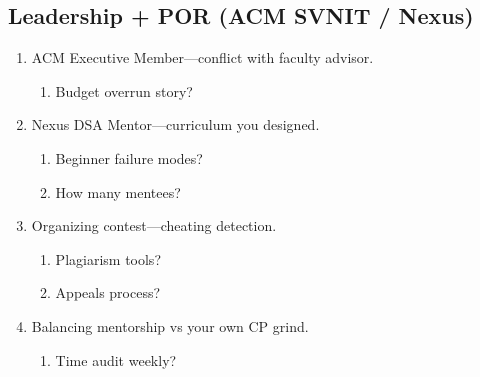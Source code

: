 \documentclass[9pt,a4paper]{article}
\begin{document}
\subsection{Leadership + POR (ACM SVNIT / Nexus)}
\begin{enumerate}[label=\textbf{Q\arabic*:}, leftmargin=*]
  \item ACM Executive Member---conflict with faculty advisor.
  \begin{enumerate}[label=\textit{FU\arabic*:}, leftmargin=2em]
    \item Budget overrun story?
  \end{enumerate}
  \item Nexus DSA Mentor---curriculum you designed.
  \begin{enumerate}[label=\textit{FU\arabic*:}, leftmargin=2em]
    \item Beginner failure modes?
    \item How many mentees?
  \end{enumerate}
  \item Organizing contest---cheating detection.
  \begin{enumerate}[label=\textit{FU\arabic*:}, leftmargin=2em]
    \item Plagiarism tools?
    \item Appeals process?
  \end{enumerate}
  \item Balancing mentorship vs your own CP grind.
  \begin{enumerate}[label=\textit{FU\arabic*:}, leftmargin=2em]
    \item Time audit weekly?
  \end{enumerate}
\end{enumerate}
\end{document}
